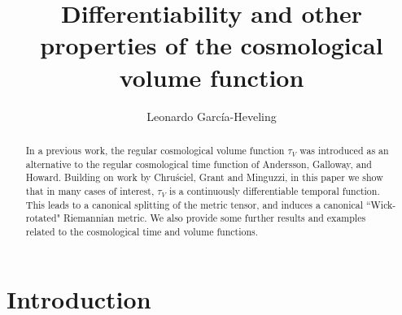 \documentclass[a4paper,11pt]{amsart}
\title[Differentiability of the cosmological volume function]{Differentiability and other properties of the cosmological volume function}
\author{Leonardo Garc\'ia-Heveling}
\begin{document}
\begin{abstract}
    In a previous work, the regular cosmological volume function $\tau_V$ was introduced as an alternative to the regular cosmological time function of Andersson, Galloway, and Howard. Building on work by Chruściel, Grant and Minguzzi, in this paper we show that in many cases of interest, $\tau_V$ is a continuously differentiable temporal function. This leads to a canonical splitting of the metric tensor, and induces a canonical ``Wick-rotated" Riemannian metric. We also provide some further results and examples related to the cosmological time and volume functions.
\end{abstract}

\maketitle

\section{Introduction}
\end{document}
